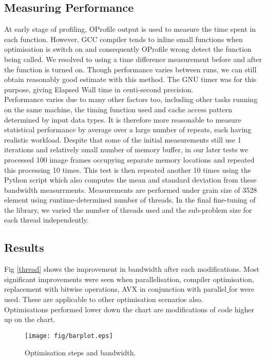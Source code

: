 \documentclass[journal]{IEEEtran}
\begin{document}
\subsection{Measuring Performance}
At early stage of profiling, OProfile output is used to measure the time spent in each function. However, GCC compiler tends to inline small functions when optimisation is switch on and consequently OProfile wrong detect the function being called. We resolved to using a time difference measurement before and after the function is turned on. Though performance varies between runs, we can still obtain reasonably good estimate with this method. The GNU timer was for this purpose, giving Elapsed Wall time in centi-second precision. \\

Performance varies due to many other factors too, including other tasks running on the same machine, the timing function used and cache access pattern determined by input data types. It is therefore more reasonable to measure statistical performance by average over a large number of repeats, each having realistic workload. Despite that some of the initial measurements still use 1 iterations and relatively small number of memory buffer, in our later tests we processed 100 image frames occupying separate memory locations and repeated this processing 10 times. This test is then repeated another 10 times using the Python script which also computes the mean and standard deviation from these bandwidth measurrments. Measurements are performed under grain size of 3528 element using runtime-determined number of threads. In the final fine-tuning of the library, we varied the number of threads used and the sub-problem size for each thread independently.

\subsection{Results}

Fig \ref{thread} shows the improvement in bandwidth after each modifications. Most significant improvements were seen when parallelisation, compiler optimisation, replacement with bitwise operations, AVX in conjunction with parallel$\_$for were used. These are applicable to other optimisation scenarios also. \\
Optimisations performed lower down the chart are modifications of code higher up on the chart.

\begin{figure}[h]
\centering
\texttt{[image: fig/barplot.eps]}
\caption{Optimisation steps and bandwidth. }

\end{figure}
\end{document}
